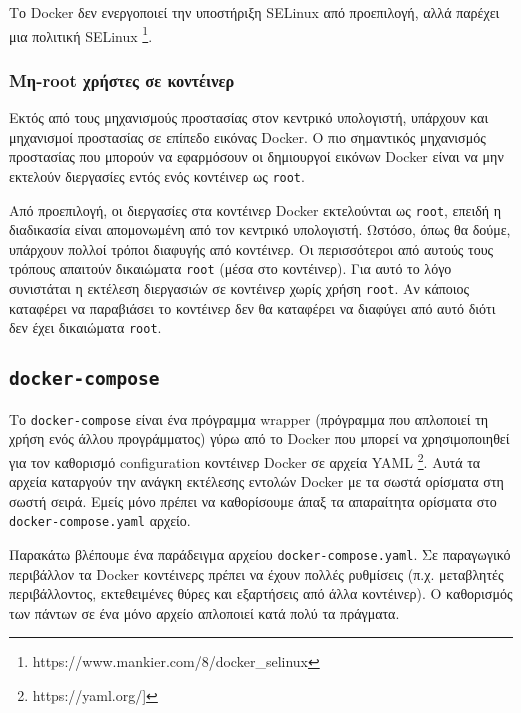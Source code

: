 Το \textlatin{Docker} δεν ενεργοποιεί την υποστήριξη \textlatin{SELinux} από
προεπιλογή, αλλά παρέχει μια πολιτική \textlatin{SELinux}
\footnote{\textlatin{https://www.mankier.com/8/docker\_selinux}}.

\subsubsection{Μη-\textlatin{root} χρήστες σε κοντέινερ}

Εκτός από τους μηχανισμούς προστασίας στον κεντρικό υπολογιστή, υπάρχουν και 
μηχανισμοί προστασίας σε επίπεδο εικόνας \textlatin{Docker}. Ο πιο σημαντικός
μηχανισμός προστασίας που μπορούν να εφαρμόσουν οι δημιουργοί εικόνων
\textlatin{Docker} είναι να μην εκτελούν διεργασίες εντός ενός κοντέινερ ως
\texttt{\textlatin{root}}.

Από προεπιλογή, οι διεργασίες στα κοντέινερ \textlatin{Docker} εκτελούνται ως
\texttt{\textlatin{root}}, επειδή η διαδικασία είναι απομονωμένη από τον
κεντρικό υπολογιστή. Ωστόσο, όπως θα δούμε, υπάρχουν πολλοί τρόποι διαφυγής
από κοντέινερ. Οι περισσότεροι από αυτούς τους τρόπους απαιτούν δικαιώματα
\texttt{\textlatin{root}} (μέσα στο κοντέινερ). Για αυτό το λόγο συνιστάται η
εκτέλεση διεργασιών σε κοντέινερ χωρίς χρήση \texttt{\textlatin{root}}. Αν
κάποιος καταφέρει να παραβιάσει το κοντέινερ δεν θα καταφέρει να διαφύγει από
αυτό διότι δεν έχει δικαιώματα \texttt{\textlatin{root}}.

\subsection{\texttt{\textlatin{docker-compose}}}

Το \texttt{\textlatin{docker-compose}} είναι ένα πρόγραμμα \textlatin{wrapper}
(πρόγραμμα που απλοποιεί τη χρήση ενός άλλου προγράμματος) γύρω από το
\textlatin{Docker} που μπορεί να χρησιμοποιηθεί για τον καθορισμό
\textlatin{configuration} κοντέινερ \textlatin{Docker} σε αρχεία
\textlatin{YAML} \footnote{\textlatin{https://yaml.org/]}}. Αυτά τα αρχεία
καταργούν την ανάγκη εκτέλεσης εντολών \textlatin{Docker} με τα σωστά ορίσματα
στη σωστή σειρά. Εμείς μόνο πρέπει να καθορίσουμε άπαξ τα απαραίτητα ορίσματα
στο \texttt{\textlatin{docker-compose.yaml}} αρχείο.

Παρακάτω βλέπουμε ένα παράδειγμα αρχείου
\texttt{\textlatin{docker-compose.yaml}}. Σε παραγωγικό περιβάλλον τα
\textlatin{Docker} κοντέινερς πρέπει να έχουν πολλές ρυθμίσεις (π.χ.
μεταβλητές περιβάλλοντος, εκτεθειμένες θύρες και εξαρτήσεις από άλλα κοντέινερ).
Ο καθορισμός των πάντων σε ένα μόνο αρχείο απλοποιεί κατά πολύ τα πράγματα.


